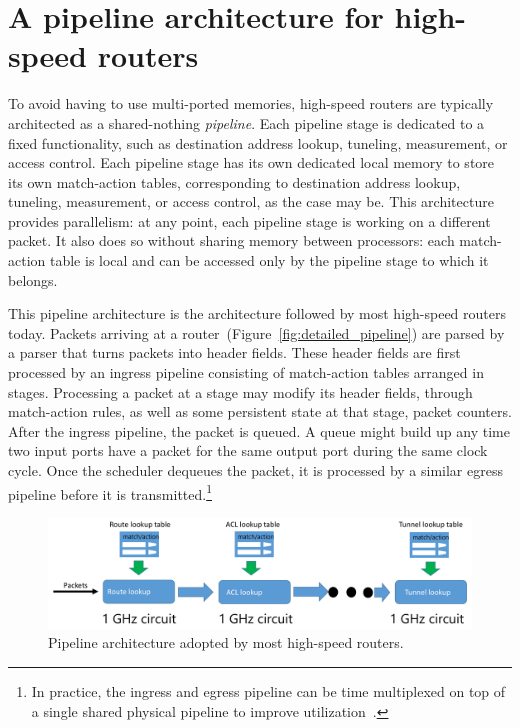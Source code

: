 \section{A pipeline architecture for high-speed routers}
\label{s:router_pipeline_arch}

To avoid having to use multi-ported memories, high-speed routers are typically
architected as a shared-nothing {\em pipeline}. Each pipeline stage is
dedicated to a fixed functionality, such as destination address lookup,
tuneling, measurement, or access control. Each pipeline stage has its own
dedicated local memory to store its own match-action tables, corresponding to
destination address lookup, tuneling, measurement, or access control, as the
case may be. This architecture provides parallelism: at any point, each
pipeline stage is working on a different packet. It also does so without
sharing memory between processors: each match-action table is local and can be
accessed only by the pipeline stage to which it belongs.

This pipeline architecture is the architecture followed by most high-speed
routers today. Packets arriving at a
router~(Figure~\ref{fig:detailed_pipeline}) are parsed by a parser that turns
packets into header fields. These header fields are first processed by an
ingress pipeline consisting of match-action tables arranged in stages.
Processing a packet at a stage may modify its header fields, through
match-action rules, as well as some persistent state at that stage, \eg packet
counters. After the ingress pipeline, the packet is queued. A queue might build
up any time two input ports have a packet for the same output port during the
same clock cycle. Once the scheduler dequeues the packet, it is processed by a
similar egress pipeline before it is transmitted.\footnote{In practice, the
ingress and egress pipeline can be time multiplexed on top of a single shared
physical pipeline to improve utilization~\cite{rmt}.}

\begin{figure}[!t]
\includegraphics[width=\textwidth]{pipeline.pdf}
\caption{Pipeline architecture adopted by most high-speed routers.}
\label{fig:pipeline}
\end{figure}

